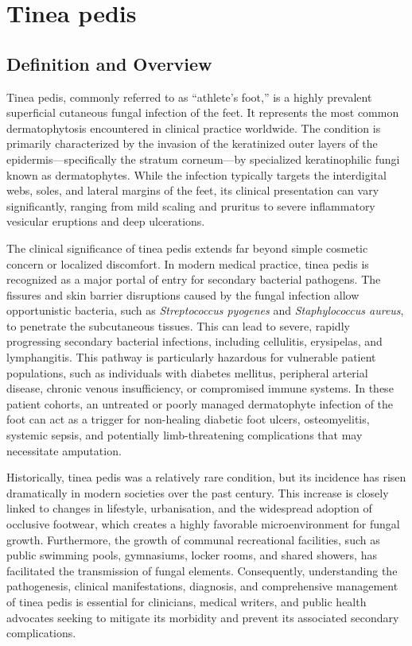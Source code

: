 \chapter{Tinea pedis}

\section*{Definition and Overview}
Tinea pedis, commonly referred to as ``athlete's foot,'' is a highly prevalent superficial cutaneous fungal infection of the feet. It represents the most common dermatophytosis encountered in clinical practice worldwide. The condition is primarily characterized by the invasion of the keratinized outer layers of the epidermis—specifically the stratum corneum—by specialized keratinophilic fungi known as dermatophytes. While the infection typically targets the interdigital webs, soles, and lateral margins of the feet, its clinical presentation can vary significantly, ranging from mild scaling and pruritus to severe inflammatory vesicular eruptions and deep ulcerations.

The clinical significance of tinea pedis extends far beyond simple cosmetic concern or localized discomfort. In modern medical practice, tinea pedis is recognized as a major portal of entry for secondary bacterial pathogens. The fissures and skin barrier disruptions caused by the fungal infection allow opportunistic bacteria, such as \textit{Streptococcus pyogenes} and \textit{Staphylococcus aureus}, to penetrate the subcutaneous tissues. This can lead to severe, rapidly progressing secondary bacterial infections, including cellulitis, erysipelas, and lymphangitis. This pathway is particularly hazardous for vulnerable patient populations, such as individuals with diabetes mellitus, peripheral arterial disease, chronic venous insufficiency, or compromised immune systems. In these patient cohorts, an untreated or poorly managed dermatophyte infection of the foot can act as a trigger for non-healing diabetic foot ulcers, osteomyelitis, systemic sepsis, and potentially limb-threatening complications that may necessitate amputation.

Historically, tinea pedis was a relatively rare condition, but its incidence has risen dramatically in modern societies over the past century. This increase is closely linked to changes in lifestyle, urbanisation, and the widespread adoption of occlusive footwear, which creates a highly favorable microenvironment for fungal growth. Furthermore, the growth of communal recreational facilities, such as public swimming pools, gymnasiums, locker rooms, and shared showers, has facilitated the transmission of fungal elements. Consequently, understanding the pathogenesis, clinical manifestations, diagnosis, and comprehensive management of tinea pedis is essential for clinicians, medical writers, and public health advocates seeking to mitigate its morbidity and prevent its associated secondary complications.

